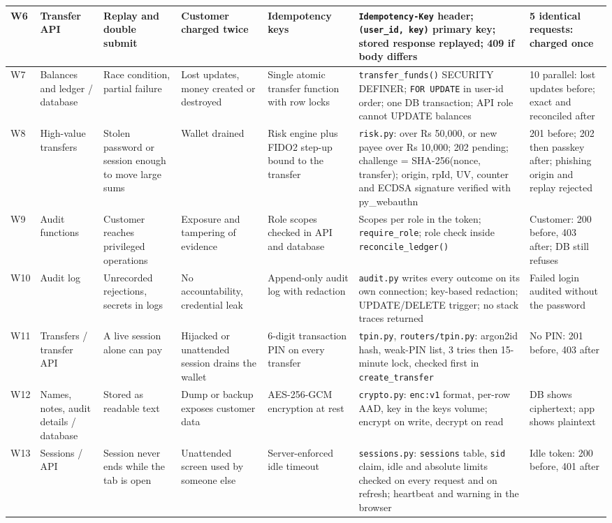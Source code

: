 \documentclass[11pt,a4paper]{article}
\newcommand{\code}[1]{\texttt{#1}}
\begin{document}
\begin{landscape}
\begin{longtable}{P{0.7cm}P{2.6cm}P{3.3cm}P{2.6cm}P{3.4cm}P{5.2cm}P{3.3cm}}
\midrule
W6 & Transfer API & Replay and double submit & Customer charged twice & Idempotency keys & \code{Idempotency-Key} header; \code{(user\_id, key)} primary key; stored response replayed; 409 if body differs & 5 identical requests: charged once \\
\midrule
W7 & Balances and ledger / database & Race condition, partial failure & Lost updates, money created or destroyed & Single atomic transfer function with row locks & \code{transfer\_funds()} SECURITY DEFINER; \code{FOR UPDATE} in user-id order; one DB transaction; API role cannot UPDATE balances & 10 parallel: lost updates before; exact and reconciled after \\
\midrule
W8 & High-value transfers & Stolen password or session enough to move large sums & Wallet drained & Risk engine plus FIDO2 step-up bound to the transfer & \code{risk.py}: over Rs 50,000, or new payee over Rs 10,000; 202 pending; challenge = SHA-256(nonce, transfer); origin, rpId, UV, counter and ECDSA signature verified with py\_webauthn & 201 before; 202 then passkey after; phishing origin and replay rejected \\
\midrule
W9 & Audit functions & Customer reaches privileged operations & Exposure and tampering of evidence & Role scopes checked in API and database & Scopes per role in the token; \code{require\_role}; role check inside \code{reconcile\_ledger()} & Customer: 200 before, 403 after; DB still refuses \\
\midrule
W10 & Audit log & Unrecorded rejections, secrets in logs & No accountability, credential leak & Append-only audit log with redaction & \code{audit.py} writes every outcome on its own connection; key-based redaction; UPDATE/DELETE trigger; no stack traces returned & Failed login audited without the password \\
\midrule
W11 & Transfers / transfer API & A live session alone can pay & Hijacked or unattended session drains the wallet & 6-digit transaction PIN on every transfer & \code{tpin.py}, \code{routers/tpin.py}: argon2id hash, weak-PIN list, 3 tries then 15-minute lock, checked first in \code{create\_transfer} & No PIN: 201 before, 403 after \\
\midrule
W12 & Names, notes, audit details / database & Stored as readable text & Dump or backup exposes customer data & AES-256-GCM encryption at rest & \code{crypto.py}: \code{enc:v1} format, per-row AAD, key in the keys volume; encrypt on write, decrypt on read & DB shows ciphertext; app shows plaintext \\
\midrule
W13 & Sessions / API & Session never ends while the tab is open & Unattended screen used by someone else & Server-enforced idle timeout & \code{sessions.py}: \code{sessions} table, \code{sid} claim, idle and absolute limits checked on every request and on refresh; heartbeat and warning in the browser & Idle token: 200 before, 401 after \\
\bottomrule
\end{longtable}
\end{landscape}
\end{document}
